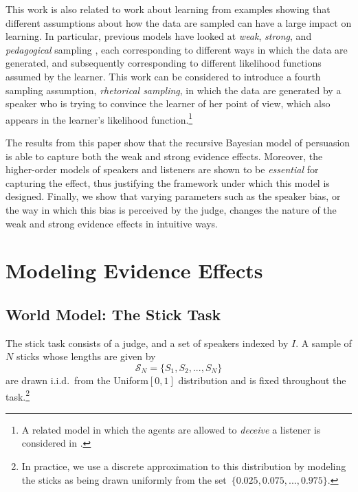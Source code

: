 \documentclass[10pt,letterpaper]{article}
\begin{document}
This work is also related to work about learning from examples showing that different assumptions
about how the data are sampled can have a large impact on learning. In particular, previous models have 
looked at \textit{weak}, \textit{strong}, and \textit{pedagogical} sampling 
\cite{hsu2009differential, shafto_rational_2014, tenenbaum1999bayesian, tenenbaum2001generalization}, each corresponding to different ways
in which the data are generated, and subsequently corresponding to different likelihood functions assumed by
the learner. This work can be considered to introduce a fourth sampling assumption, \textit{rhetorical sampling},
in which the data are generated by a speaker who is trying to convince the learner of her point of view, which
also appears in the learner's likelihood function.\footnote{A related model in which the agents are allowed to \textit{deceive}
a listener is considered in .	}

The results from this paper show that the recursive Bayesian model of persuasion is able to capture both the
weak and strong evidence effects. Moreover, the higher-order models of speakers and listeners are shown to
be \textit{essential} for capturing the effect, thus justifying the framework under which this model is designed. 
Finally, we show that varying parameters such as the speaker bias, or the way in which this bias is perceived by
the judge, changes the nature of the weak and strong evidence effects in intuitive ways.

\section{Modeling Evidence Effects}
\subsection{World Model: The Stick Task}
The stick task consists of a judge, and a set of speakers indexed by $I$. 
A sample of $N$ sticks whose lengths are given by
\begin{equation}
\mathcal{S}_N = \{ S_1, S_2, ..., S_N \}
\end{equation}
are drawn i.i.d.\ from the Uniform$[0,1]$ distribution and is fixed throughout
the task.\footnote{In practice, we use a discrete approximation to this distribution 
by modeling the sticks as being drawn uniformly from the set~${\{ 0.025, 0.075, ..., 0.975\}}$.} 
\end{document}
